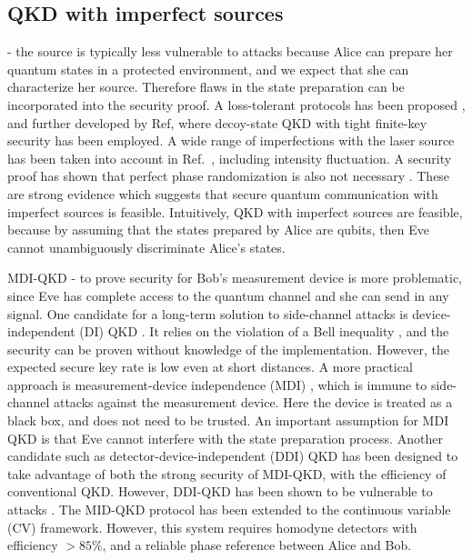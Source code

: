 \subsection{QKD with imperfect sources} - the source is typically less vulnerable to attacks because Alice can prepare her quantum states in
a protected environment, and we expect that she can characterize her source. Therefore flaws in the state preparation can be incorporated into the security proof.
% 
% 
A loss-tolerant protocols has been proposed \cite{PhysRevA.90.052314}, and further developed by Ref\cite{PhysRevA.92.032305}, where
decoy-state QKD with tight finite-key security has been employed. A wide range of imperfections with the laser source has been taken into account in Ref.~\cite{mizutani2015finite}, including intensity fluctuation.  A security proof has shown that perfect phase randomization is also not necessary \cite{cao2015discrete}.
% 
% 
These are strong evidence which suggests that secure quantum communication with imperfect sources is feasible\cite{diamanti2016practical}. Intuitively, QKD with imperfect sources are feasible, because by assuming that the states prepared by Alice are qubits, then Eve cannot unambiguously discriminate Alice's states\cite{diamanti2016practical}. 



MDI-QKD - 
% 
to prove security for Bob's measurement device is more problematic, since Eve has complete access to the quantum channel and she can send in any signal. 
One candidate for a long-term solution to side-channel attacks is device-independent (DI) QKD \cite{PhysRevLett.98.230501}. It relies on the violation of a Bell inequality \cite{hensen2015loophole}, and the security can be proven without knowledge of the implementation. However, the expected secure key rate is low even at short distances. A more practical approach is measurement-device independence (MDI) \cite{PhysRevLett.108.130503}, which is immune to side-channel attacks against the measurement device. Here the device is treated as a black box, and does not need to be trusted. An important assumption for MDI QKD is that Eve cannot interfere with the state preparation process. 
% 
Another candidate such as 
detector-device-independent\cite{lim2014detector,PhysRevA.92.022337} (DDI) QKD has been designed to take advantage of both the strong security of MDI-QKD, with the efficiency of conventional QKD. However, DDI-QKD has been shown to be vulnerable to attacks \cite{PhysRevLett.117.250505}. 
% 
The MID-QKD protocol has been extended to the continuous variable (CV) framework. However, this system requires homodyne detectors with efficiency $> 85\%$, and a reliable phase reference between Alice and Bob.  

